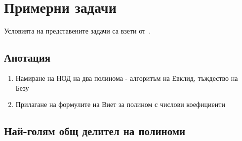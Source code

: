\documentclass[numbers=endperiod, bibliography=totocnumbered]{scrartcl}
\begin{document}
\section{Примерни задачи}

Условията на представените задачи са взети от~\cite{PolynomialExercises}.

\subsection{Анотация}

\begin{enumerate}
  \item Намиране на НОД на два полинома - алгоритъм на Евклид, тъждество на Безу
  \item Прилагане на формулите на Виет за полином с числови коефициенти
\end{enumerate}

\subsection{Най-голям общ делител на полиноми}
\end{document}
